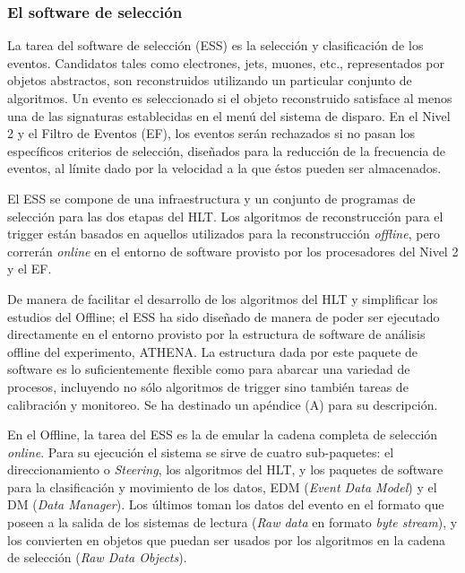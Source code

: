 \subsubsection{El software de selecci\'on}
\label{'HLTalgos'}
   
 La tarea del software de selecci\'on (ESS) es la selecci\'on y clasificaci\'on de los eventos. Candidatos tales como electrones, jets, muones, etc., representados por objetos abstractos, son reconstruidos utilizando un particular conjunto de algoritmos. Un evento es seleccionado si el objeto reconstruido satisface al menos una de las signaturas establecidas en el men\'u del sistema de disparo. En el Nivel 2 y el Filtro de Eventos (EF), los eventos ser\'an rechazados si no pasan los espec\'ificos criterios de selecci\'on, dise\~nados para la reducci\'on de la frecuencia de eventos, al l\'imite dado por la velocidad a la que \'estos pueden ser almacenados.

 El ESS se compone de una infraestructura y un conjunto de programas de selecci\'on para las dos etapas del HLT.  Los algoritmos de reconstrucci\'on para el trigger est\'an basados en aquellos utilizados para la reconstrucci\'on \emph{offline}, pero correr\'an \emph{online} en el entorno de software provisto por los procesadores del Nivel 2 y el EF. 

  De manera de facilitar el desarrollo de los algoritmos del HLT y simplificar los estudios del Offline; el ESS ha sido dise\~nado de manera de poder ser ejecutado directamente en el entorno provisto por la estructura de software de an\'alisis offline del experimento, ATHENA\cite{Athena}. La estructura dada por este paquete de software es lo suficientemente flexible como para abarcar una variedad de procesos, incluyendo no s\'olo algoritmos de trigger sino tambi\'en tareas de calibraci\'on y monitoreo. Se ha destinado un ap\'endice (A) para su descripci\'on.
 
  En el Offline, la tarea del ESS es la de emular la cadena completa de selecci\'on \emph{online}. Para su ejecuci\'on el sistema se sirve de cuatro sub-paquetes: el direccionamiento o \emph{Steering}, los algoritmos del HLT, y los paquetes de software para la clasificaci\'on y movimiento de los datos, EDM (\emph{Event Data Model}) y el DM (\emph{Data Manager}). Los \'ultimos toman los datos del evento en el formato que poseen a la salida de los sistemas de lectura (\emph{Raw data} en formato \emph{byte stream}), y los convierten en objetos que puedan ser usados por los algoritmos en la cadena de selecci\'on (\emph{Raw Data Objects}).


